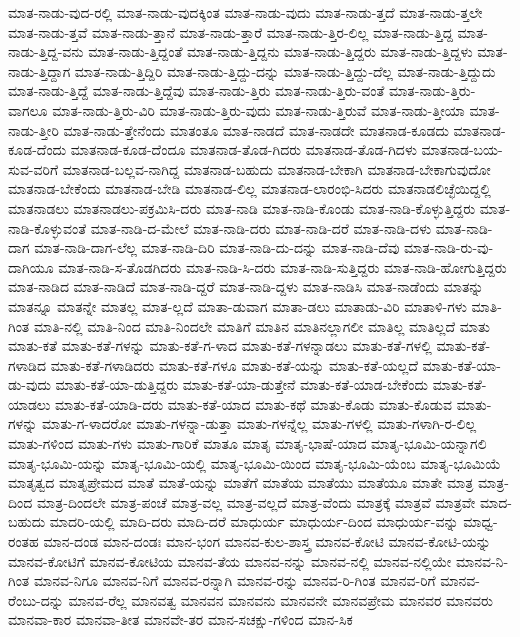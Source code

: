 {ಮಾತ-ನಾಡು-ವುದ-ರಲ್ಲಿ
ಮಾತ-ನಾಡು-ವುದಕ್ಕಿಂತ
ಮಾತ-ನಾಡು-ವುದು
ಮಾತ-ನಾಡು-ತ್ತದೆ
ಮಾತ-ನಾಡು-ತ್ತಲೇ
ಮಾತ-ನಾಡು-ತ್ತವೆ
ಮಾತ-ನಾಡು-ತ್ತಾನೆ
ಮಾತ-ನಾಡು-ತ್ತಾರೆ
ಮಾತ-ನಾಡು-ತ್ತಿರ-ಲಿಲ್ಲ
ಮಾತ-ನಾಡು-ತ್ತಿದ್ದ
ಮಾತ-ನಾಡು-ತ್ತಿದ್ದ-ವನು
ಮಾತ-ನಾಡು-ತ್ತಿದ್ದಂತೆ
ಮಾತ-ನಾಡು-ತ್ತಿದ್ದನು
ಮಾತ-ನಾಡು-ತ್ತಿದ್ದರು
ಮಾತ-ನಾಡು-ತ್ತಿದ್ದಳು
ಮಾತ-ನಾಡು-ತ್ತಿದ್ದಾಗ
ಮಾತ-ನಾಡು-ತ್ತಿದ್ದಿರಿ
ಮಾತ-ನಾಡು-ತ್ತಿದ್ದು-ದನ್ನು
ಮಾತ-ನಾಡು-ತ್ತಿದ್ದು-ದೆಲ್ಲ
ಮಾತ-ನಾಡು-ತ್ತಿದ್ದುದು
ಮಾತ-ನಾಡು-ತ್ತಿದ್ದೆ
ಮಾತ-ನಾಡು-ತ್ತಿದ್ದೆವು
ಮಾತ-ನಾಡು-ತ್ತಿರು
ಮಾತ-ನಾಡು-ತ್ತಿರು-ವಂತೆ
ಮಾತ-ನಾಡು-ತ್ತಿರು-ವಾಗಲೂ
ಮಾತ-ನಾಡು-ತ್ತಿರು-ವಿರಿ
ಮಾತ-ನಾಡು-ತ್ತಿರು-ವುದು
ಮಾತ-ನಾಡು-ತ್ತಿರುವೆ
ಮಾತ-ನಾಡು-ತ್ತೀಯಾ
ಮಾತ-ನಾಡು-ತ್ತೀರಿ
ಮಾತ-ನಾಡು-ತ್ತೇನೆಂದು
ಮಾತಂತೂ
ಮಾತ-ನಾಡದೆ
ಮಾತ-ನಾಡದೇ
ಮಾತನಾಡ-ಕೂಡದು
ಮಾತನಾಡ-ಕೂಡ-ದೆಂದು
ಮಾತನಾಡ-ಕೂಡ-ದೆಂದೂ
ಮಾತನಾಡ-ತೊಡ-ಗಿದರು
ಮಾತನಾಡ-ತೊಡ-ಗಿದಳು
ಮಾತನಾಡ-ಬಯ-ಸುವ-ವರಿಗೆ
ಮಾತನಾಡ-ಬಲ್ಲವ-ನಾಗಿದ್ದ
ಮಾತನಾಡ-ಬಹುದು
ಮಾತನಾಡ-ಬೇಕಾಗಿ
ಮಾತನಾಡ-ಬೇಕಾಗುವುದೋ
ಮಾತನಾಡ-ಬೇಕೆಂದು
ಮಾತನಾಡ-ಬೇಡಿ
ಮಾತನಾಡ-ಲಿಲ್ಲ
ಮಾತನಾಡ-ಲಾರಂಭಿ-ಸಿದರು
ಮಾತನಾಡಲಿಚ್ಛೆಯಿದ್ದಲ್ಲಿ
ಮಾತನಾಡಲು
ಮಾತನಾಡಲು-ಪಕ್ರಮಿಸಿ-ದರು
ಮಾತ-ನಾಡಿ
ಮಾತ-ನಾಡಿ-ಕೊಂಡು
ಮಾತ-ನಾಡಿ-ಕೊಳ್ಳುತ್ತಿದ್ದರು
ಮಾತ-ನಾಡಿ-ಕೊಳ್ಳುವಂತೆ
ಮಾತ-ನಾಡಿ-ದ-ಮೇಲೆ
ಮಾತ-ನಾಡಿ-ದರು
ಮಾತ-ನಾಡಿ-ದರೆ
ಮಾತ-ನಾಡಿ-ದಳು
ಮಾತ-ನಾಡಿ-ದಾಗ
ಮಾತ-ನಾಡಿ-ದಾಗ-ಲೆಲ್ಲ
ಮಾತ-ನಾಡಿ-ದಿರಿ
ಮಾತ-ನಾಡಿ-ದು-ದನ್ನು
ಮಾತ-ನಾಡಿ-ದೆವು
ಮಾತ-ನಾಡಿ-ರು-ವು-ದಾಗಿಯೂ
ಮಾತ-ನಾಡಿ-ಸ-ತೊಡಗಿದರು
ಮಾತ-ನಾಡಿ-ಸಿ-ದರು
ಮಾತ-ನಾಡಿ-ಸುತ್ತಿದ್ದರು
ಮಾತ-ನಾಡಿ-ಹೋಗುತ್ತಿದ್ದರು
ಮಾತ-ನಾಡಿದ
ಮಾತ-ನಾಡಿದೆ
ಮಾತ-ನಾಡಿ-ದ್ದರೆ
ಮಾತ-ನಾಡಿ-ದ್ದಳು
ಮಾತ-ನಾಡಿಸಿ
ಮಾತ-ನಾಡೆಂದು
ಮಾತನ್ನು
ಮಾತನ್ನೂ
ಮಾತನ್ನೇ
ಮಾತಲ್ಲ
ಮಾತ-ಲ್ಲದೆ
ಮಾತಾ-ಡುವಾಗ
ಮಾತಾ-ಡಲು
ಮಾತಾಡು-ವಿರಿ
ಮಾತಾಳಿ-ಗಳು
ಮಾತಿ-ಗಿಂತ
ಮಾತಿ-ನಲ್ಲಿ
ಮಾತಿ-ನಿಂದ
ಮಾತಿ-ನಿಂದಲೇ
ಮಾತಿಗೆ
ಮಾತಿನ
ಮಾತಿನಲ್ಲಾಗಲೀ
ಮಾತಿಲ್ಲ
ಮಾತಿಲ್ಲದೆ
ಮಾತು
ಮಾತು-ಕತೆ
ಮಾತು-ಕತೆ-ಗಳನ್ನು
ಮಾತು-ಕತೆ-ಗ-ಳಾದ
ಮಾತು-ಕತೆ-ಗಳನ್ನಾಡಲು
ಮಾತು-ಕತೆ-ಗಳಲ್ಲಿ
ಮಾತು-ಕತೆ-ಗಳಾಡಿದ
ಮಾತು-ಕತೆ-ಗಳಾಡಿದರು
ಮಾತು-ಕತೆ-ಗಳೂ
ಮಾತು-ಕತೆ-ಯನ್ನು
ಮಾತು-ಕತೆ-ಯಲ್ಲದೆ
ಮಾತು-ಕತೆ-ಯಾ-ಡು-ವುದು
ಮಾತು-ಕತೆ-ಯಾ-ಡುತ್ತಿದ್ದರು
ಮಾತು-ಕತೆ-ಯಾ-ಡುತ್ತೇನೆ
ಮಾತು-ಕತೆ-ಯಾಡ-ಬೇಕೆಂದು
ಮಾತು-ಕತೆ-ಯಾಡಲು
ಮಾತು-ಕತೆ-ಯಾಡಿ-ದರು
ಮಾತು-ಕತೆ-ಯಾದ
ಮಾತು-ಕಥೆ
ಮಾತು-ಕೊಡು
ಮಾತು-ಕೊಡುವ
ಮಾತು-ಗಳನ್ನು
ಮಾತು-ಗ-ಳಾದರೋ
ಮಾತು-ಗಳನ್ನಾ-ಡುತ್ತಾ
ಮಾತು-ಗಳನ್ನೆಲ್ಲ
ಮಾತು-ಗಳಲ್ಲಿ
ಮಾತು-ಗಳಾಗಿ-ರ-ಲಿಲ್ಲ
ಮಾತು-ಗಳಿಂದ
ಮಾತು-ಗಳು
ಮಾತು-ಗಾರಿಕೆ
ಮಾತೂ
ಮಾತೃ
ಮಾತೃ-ಭಾಷೆ-ಯಾದ
ಮಾತೃ-ಭೂಮಿ-ಯನ್ನಾಗಲಿ
ಮಾತೃ-ಭೂಮಿ-ಯನ್ನು
ಮಾತೃ-ಭೂಮಿ-ಯಲ್ಲಿ
ಮಾತೃ-ಭೂಮಿ-ಯಿಂದ
ಮಾತೃ-ಭೂಮಿ-ಯೆಂಬ
ಮಾತೃ-ಭೂಮಿಯೆ
ಮಾತೃತ್ವದ
ಮಾತೃಪ್ರೇಮದ
ಮಾತೆ
ಮಾತೆ-ಯನ್ನು
ಮಾತೆಗೆ
ಮಾತೆಯ
ಮಾತೆಯು
ಮಾತೆಯೂ
ಮಾತೇ
ಮಾತ್ರ
ಮಾತ್ರ-ದಿಂದ
ಮಾತ್ರ-ದಿಂದಲೇ
ಮಾತ್ರ-ಪಂಚೆ
ಮಾತ್ರ-ವಲ್ಲ
ಮಾತ್ರ-ವಲ್ಲದೆ
ಮಾತ್ರ-ವೆಂದು
ಮಾತ್ರಕ್ಕೆ
ಮಾತ್ರವೆ
ಮಾತ್ರವೇ
ಮಾದ-ಬಹುದು
ಮಾದರಿ-ಯಲ್ಲಿ
ಮಾದಿ-ದರು
ಮಾದಿ-ದರೆ
ಮಾಧುರ್ಯ
ಮಾಧುರ್ಯ-ದಿಂದ
ಮಾಧುರ್ಯ-ವನ್ನು
ಮಾಧ್ವ-ರಂತಹ
ಮಾನ-ದಂಡ
ಮಾನ-ದಂಡಃ
ಮಾನ-ಭಂಗ
ಮಾನವ-ಕುಲ-ಶಾಸ್ತ್ರ
ಮಾನವ-ಕೋಟಿ
ಮಾನವ-ಕೋಟಿ-ಯನ್ನು
ಮಾನವ-ಕೋಟಿಗೆ
ಮಾನವ-ಕೋಟಿಯ
ಮಾನವ-ತೆಯ
ಮಾನವ-ನನ್ನು
ಮಾನವ-ನಲ್ಲಿ
ಮಾನವ-ನಲ್ಲಿಯೇ
ಮಾನವ-ನಿ-ಗಿಂತ
ಮಾನವ-ನಿಗೂ
ಮಾನವ-ನಿಗೆ
ಮಾನವ-ರನ್ನಾಗಿ
ಮಾನವ-ರನ್ನು
ಮಾನವ-ರಿ-ಗಿಂತ
ಮಾನವ-ರಿಗೆ
ಮಾನವ-ರೆಂಬು-ದನ್ನು
ಮಾನವ-ರೆಲ್ಲ
ಮಾನವತ್ವ
ಮಾನವನ
ಮಾನವನು
ಮಾನವನೇ
ಮಾನವಪ್ರೇಮ
ಮಾನವರ
ಮಾನವರು
ಮಾನವಾ-ಕಾರ
ಮಾನವಾ-ತೀತ
ಮಾನವೇ-ತರ
ಮಾನ-ಸಚಕ್ಷು-ಗಳಿಂದ
ಮಾನ-ಸಿಕ
}
